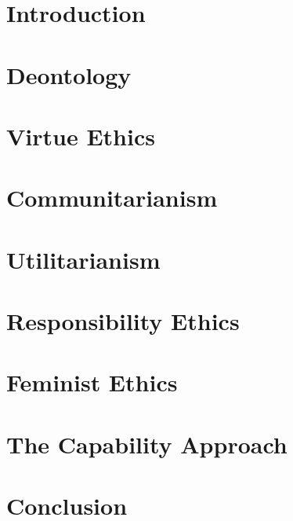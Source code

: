 \documentclass[11pt]{article}
\begin{document}
\maketitle


\section{Introduction}


\section{Deontology}


\section{Virtue Ethics}


\section{Communitarianism}



\section{Utilitarianism}



\section{Responsibility Ethics}


\section{Feminist Ethics}


\section{The Capability Approach}


\section{Conclusion}

\end{document}
